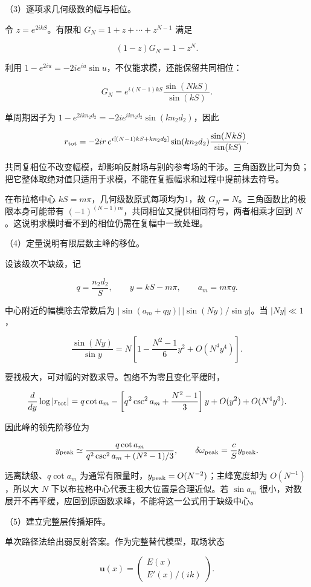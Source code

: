 \documentclass[12pt,a4paper,fontset=fandol]{ctexart}
\begin{document}
（3）逐项求几何级数的幅与相位。

令 \(z=e^{2ikS}\)。有限和 \(G_N=1+z+\cdots+z^{N-1}\) 满足

\[
(1-z)G_N=1-z^N.
\]

利用 \(1-e^{2iu}=-2ie^{iu}\sin u\)，不仅能求模，还能保留共同相位：

\[
G_N=e^{i(N-1)kS}\frac{\sin(NkS)}{\sin(kS)}.
\]

单周期因子为 \(1-e^{2ikn_2d_2}=-2ie^{ikn_2d_2}\sin(kn_2d_2)\)，因此

\[
r_{\rm tot}
=-2ir\,e^{i[(N-1)kS+kn_2d_2]}
\sin(kn_2d_2)\frac{\sin(NkS)}{\sin(kS)}.
\]

共同复相位不改变幅模，却影响反射场与别的参考场的干涉。三角函数比可为负；把它整体取绝对值只适用于求模，不能在复振幅求和过程中提前抹去符号。

在布拉格中心 \(kS=m\pi\)，几何级数原式每项均为1，故
\(G_N=N\)。三角函数比的极限本身可能带有
\((-1)^{(N-1)m}\)，共同相位又提供相同符号，两者相乘才回到
\(N\)。这说明求模时看不到的相位仍需在复幅中一致处理。

（4）定量说明有限层数主峰的移位。

设该级次不缺级，记

\[
q=\frac{n_2d_2}{S},\qquad y=kS-m\pi,\qquad a_m=m\pi q.
\]

中心附近的幅模除去常数后为 \(|\sin(a_m+qy)|\,|\sin(Ny)/\sin y|\)。当
\(|Ny|\ll1\)，

\[
\frac{\sin(Ny)}{\sin y}
=N\left[1-\frac{N^2-1}{6}y^2+O(N^4y^4)\right].
\]

要找极大，可对幅的对数求导。包络不为零且变化平缓时，

\[
\frac d{dy}\log|r_{\rm tot}|
=q\cot a_m
-\left[q^2\csc^2a_m+\frac{N^2-1}{3}\right]y
+O(y^2)+O(N^4y^3).
\]

因此峰的领先阶移位为

\[
y_{\rm peak}\simeq
\frac{q\cot a_m}
{q^2\csc^2a_m+(N^2-1)/3},\qquad
\delta\omega_{\rm peak}=\frac cS y_{\rm peak}.
\]

远离缺级、\(q\cot a_m\)
为通常有限量时，\(y_{\rm peak}=O(N^{-2})\)；主峰宽度却为
\(O(N^{-1})\)，所以大 \(N\) 下以布拉格中心代表主极大位置是合理近似。若
\(\sin a_m\)
很小，对数展开不再平缓，应回到原函数求峰，不能将这一公式用于缺级中心。

（5）建立完整层传播矩阵。

单次路径法给出弱反射答案。作为完整替代模型，取场状态

\[
\boldsymbol u(x)=
\begin{pmatrix}E(x)\\E'(x)/(ik)\end{pmatrix}.
\]
\end{document}
